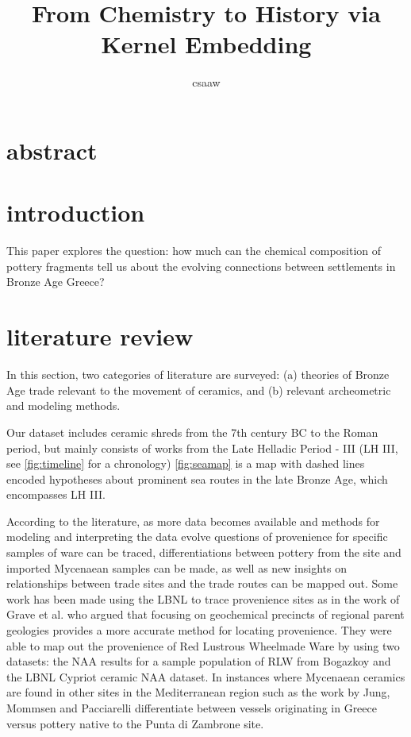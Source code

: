 \documentclass[10pt,a4paper]{article}
\author{csaaw}
\title{From Chemistry to History via Kernel Embedding}
\begin{document}
\maketitle

\section*{abstract}

\section{introduction}
\label{sec:intro}

This paper explores the question: how much can the chemical composition of pottery fragments tell us about the evolving connections between settlements in Bronze Age Greece? 




\section{literature review}
\label{sec:litrev}

In this section, two categories of literature are surveyed: (a) theories of Bronze Age trade relevant to the movement of ceramics, and (b) relevant archeometric and modeling methods.

Our dataset includes ceramic shreds from the 7th century BC to the Roman period, but mainly consists of works from the Late Helladic Period - III (LH III, see \cref{fig:timeline} for a chronology)
\cref{fig:seamap} is a map with dashed lines encoded hypotheses about prominent sea routes in the late Bronze Age, which encompasses LH III. 

According to the literature, as more data becomes available and methods for modeling and interpreting the data evolve questions of provenience for specific samples of ware can be traced, differentiations between pottery from the site and imported Mycenaean samples can be made, as well as new insights on relationships between trade sites and the trade routes can be mapped out.  Some work has been made using the LBNL to trace provenience sites as in the work of Grave et al.\cite{grave2014ceramics} who argued that focusing on geochemical precincts of regional parent geologies provides a more accurate method for locating provenience.  They were able to map out the provenience of Red Lustrous Wheelmade Ware by using two datasets:  the NAA results for a sample population of RLW from Bogazkoy and the LBNL Cypriot ceramic NAA dataset.  In instances where Mycenaean ceramics are found in other sites in the Mediterranean region such as the work by Jung, Mommsen and Pacciarelli\cite{jung2015west} differentiate between vessels originating in Greece versus pottery native to the Punta di Zambrone site.  
\end{document}
